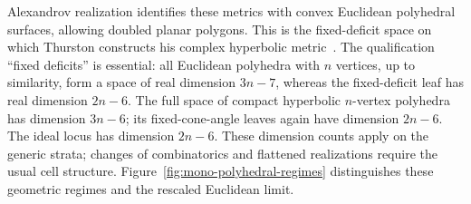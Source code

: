 Alexandrov realization identifies these metrics with convex Euclidean
polyhedral surfaces, allowing doubled planar polygons. This is the
fixed-deficit space on which Thurston constructs his complex hyperbolic
metric~\cite{ThurstonShapes,Fillastre}. The qualification ``fixed
deficits'' is essential: all Euclidean polyhedra with $n$ vertices, up
to similarity, form a space of real dimension $3n-7$, whereas the
fixed-deficit leaf has real dimension $2n-6$. The full space of compact
hyperbolic $n$-vertex polyhedra has dimension $3n-6$; its fixed-cone-angle
leaves again have dimension $2n-6$. The ideal locus has dimension $2n-6$.
These dimension counts apply on the generic strata; changes of
combinatorics and flattened realizations require the usual cell structure.
Figure~\ref{fig:mono-polyhedral-regimes} distinguishes these geometric
regimes and the rescaled Euclidean limit.

